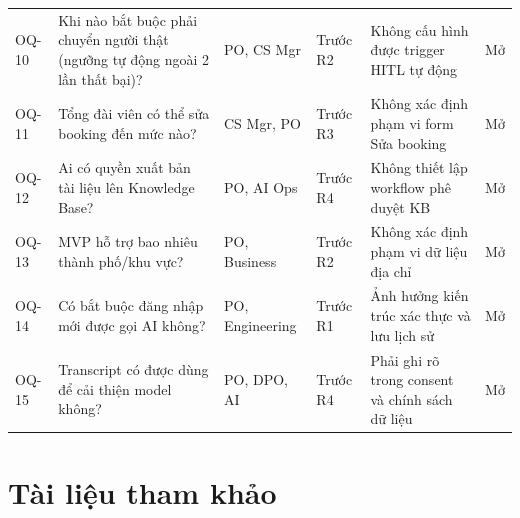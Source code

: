 \documentclass[12pt,a4paper]{article}
\newcommand{\statusopen}{\colorbox{PrioMust}{\small Mở}}
\begin{document}
\begin{longtable}{C{1.2cm} L{4.5cm} L{2.5cm} C{2cm} L{2.5cm} C{1.5cm}}
  OQ-10 & Khi nào bắt buộc phải chuyển người thật (ngưỡng tự động ngoài 2 lần thất bại)? & PO, CS Mgr & Trước R2 & Không cấu hình được trigger HITL tự động & \statusopen \\
  OQ-11 & Tổng đài viên có thể sửa booking đến mức nào? & CS Mgr, PO & Trước R3 & Không xác định phạm vi form Sửa booking & \statusopen \\
  OQ-12 & Ai có quyền xuất bản tài liệu lên Knowledge Base? & PO, AI Ops & Trước R4 & Không thiết lập workflow phê duyệt KB & \statusopen \\
  OQ-13 & MVP hỗ trợ bao nhiêu thành phố/khu vực? & PO, Business & Trước R2 & Không xác định phạm vi dữ liệu địa chỉ & \statusopen \\
  OQ-14 & Có bắt buộc đăng nhập mới được gọi AI không? & PO, Engineering & Trước R1 & Ảnh hưởng kiến trúc xác thực và lưu lịch sử & \statusopen \\
  OQ-15 & Transcript có được dùng để cải thiện model không? & PO, DPO, AI & Trước R4 & Phải ghi rõ trong consent và chính sách dữ liệu & \statusopen \\
\end{longtable}

\section*{Tài liệu tham khảo}
\end{document}
